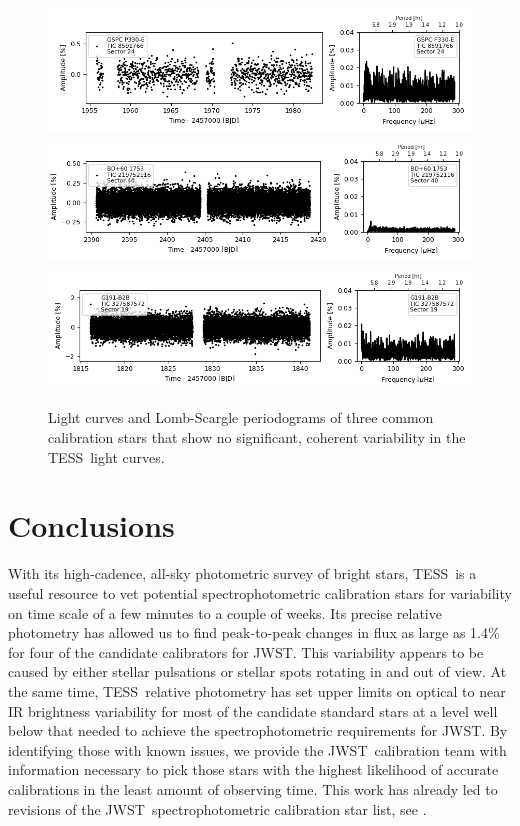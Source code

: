\documentclass[twocolumn]{aastex631}
\newcommand{\webb}{JWST}
\newcommand{\jwst}{JWST}
\newcommand{\tess}{TESS}
\begin{document}
\begin{figure}
    \centering
    \includegraphics[width=0.8\linewidth]{figures/tic00000008591766_s024_flat2.fits.png}
    \includegraphics[width=0.8\linewidth]{tic00000219752116_s040_flat1.fits.png}
    \includegraphics[width=0.8\linewidth]{figures/tic00000327587572_s019_norm1.fits.png}
    \caption{Light curves and Lomb-Scargle periodograms of three common calibration stars that show no significant, coherent variability in the \tess\ light curves.}
    \label{fig:novar}
\end{figure}

\section{Conclusions}
\label{sec:conclusion}

With its high-cadence, all-sky photometric survey of bright stars, \tess\ is a useful resource to vet potential spectrophotometric calibration stars for variability on time scale of a few minutes to a couple of weeks. Its precise relative photometry has allowed us to find peak-to-peak changes in flux as large as 1.4\% for four of the candidate calibrators for \webb. This variability appears to be caused by either stellar pulsations or stellar spots rotating in and out of view. At the same time, \tess\ relative photometry has set upper limits on optical to near IR brightness variability for most of the candidate standard stars at a level well below that needed to achieve the spectrophotometric requirements for \jwst. By identifying those with known issues, we provide the \webb\ calibration team with information necessary to pick those stars with the highest likelihood of accurate calibrations in the least amount of observing time. This work has already led to revisions of the \webb\ spectrophotometric calibration star list, see \citet{Gordon2022inprep}.
\end{document}
